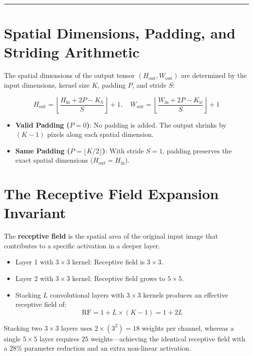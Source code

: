 \documentclass[
  letterpaper,
]{scrbook}
\providecommand{\tightlist}{%
  \setlength{\itemsep}{0pt}\setlength{\parskip}{0pt}}
\begin{document}
\begin{center}\rule{0.5\linewidth}{0.5pt}\end{center}

\section{Spatial Dimensions, Padding, and Striding
Arithmetic}\label{spatial-dimensions-padding-and-striding-arithmetic}

The spatial dimensions of the output tensor
\((H_{\text{out}}, W_{\text{out}})\) are determined by the input
dimensions, kernel size \(K\), padding \(P\), and stride \(S\):

\[H_{\text{out}} = \left\lfloor \frac{H_{\text{in}} + 2P - K_h}{S} \right\rfloor + 1, \quad W_{\text{out}} = \left\lfloor \frac{W_{\text{in}} + 2P - K_w}{S} \right\rfloor + 1\]

\begin{itemize}
\tightlist
\item
  \textbf{Valid Padding (\(P = 0\))}: No padding is added. The output
  shrinks by \((K - 1)\) pixels along each spatial dimension.
\item
  \textbf{Same Padding (\(P = \lfloor K/2 \rfloor\))}: With stride
  \(S = 1\), padding preserves the exact spatial dimensions
  (\(H_{\text{out}} = H_{\text{in}}\)).
\end{itemize}

\section{The Receptive Field Expansion
Invariant}\label{the-receptive-field-expansion-invariant}

The \textbf{receptive field} is the spatial area of the original input
image that contributes to a specific activation in a deeper layer.

\begin{itemize}
\tightlist
\item
  Layer 1 with \(3 \times 3\) kernel: Receptive field is \(3 \times 3\).
\item
  Layer 2 with \(3 \times 3\) kernel: Receptive field grows to
  \(5 \times 5\).
\item
  Stacking \(L\) convolutional layers with \(3 \times 3\) kernels
  produces an effective receptive field of:
  \[\text{RF} = 1 + L \times (K - 1) = 1 + 2L\]
\end{itemize}

Stacking two \(3 \times 3\) layers uses \(2 \times (3^2) = 18\) weights
per channel, whereas a single \(5 \times 5\) layer requires \(25\)
weights---achieving the identical receptive field with a 28\% parameter
reduction and an extra non-linear activation.
\end{document}
